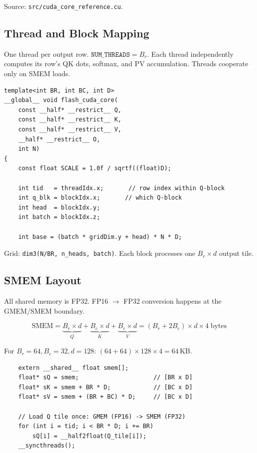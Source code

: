 \documentclass[11pt, letterpaper]{article}
\begin{document}
Source: \texttt{src/cuda\_core\_reference.cu}.

\subsection{Thread and Block Mapping}

One thread per output row. $\texttt{NUM\_THREADS} = B_r$. Each thread independently computes its row's QK dots, softmax, and PV accumulation. Threads cooperate only on SMEM loads.

\begin{lstlisting}
template<int BR, int BC, int D>
__global__ void flash_cuda_core(
    const __half* __restrict__ Q,
    const __half* __restrict__ K,
    const __half* __restrict__ V,
    __half* __restrict__ O,
    int N)
{
    const float SCALE = 1.0f / sqrtf((float)D);

    int tid   = threadIdx.x;       // row index within Q-block
    int q_blk = blockIdx.x;       // which Q-block
    int head  = blockIdx.y;
    int batch = blockIdx.z;

    int base = (batch * gridDim.y + head) * N * D;
\end{lstlisting}

Grid: \texttt{dim3(N/BR, n\_heads, batch)}. Each block processes one $B_r \times d$ output tile.

\subsection{SMEM Layout}

All shared memory is FP32. FP16 $\to$ FP32 conversion happens at the GMEM/SMEM boundary.

\begin{equation}
\text{SMEM} = \underbrace{B_r \times d}_{Q} + \underbrace{B_c \times d}_{K} + \underbrace{B_c \times d}_{V} = (B_r + 2 B_c) \times d \times 4 \;\text{bytes}
\end{equation}

For $B_r = 64, B_c = 32, d = 128$: $(64 + 64) \times 128 \times 4 = 64$\,KB.

\begin{lstlisting}
    extern __shared__ float smem[];
    float* sQ = smem;                     // [BR x D]
    float* sK = smem + BR * D;            // [BC x D]
    float* sV = smem + (BR + BC) * D;     // [BC x D]

    // Load Q tile once: GMEM (FP16) -> SMEM (FP32)
    for (int i = tid; i < BR * D; i += BR)
        sQ[i] = __half2float(Q_tile[i]);
    __syncthreads();
\end{lstlisting}
\end{document}
